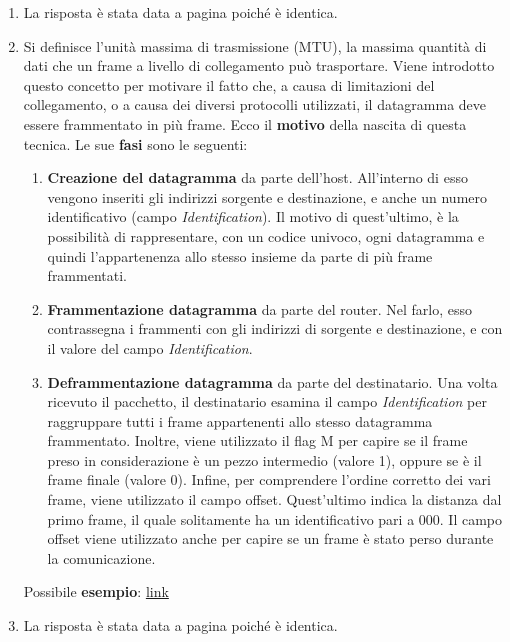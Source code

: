 \documentclass[a4paper]{article}
\begin{document}
	\begin{enumerate}
		\item La risposta è stata data a pagina \pageref{CSMA/CD} poiché è identica.
		
		\item Si definisce l'unità massima di trasmissione (MTU), la massima quantità di dati che un frame a livello di collegamento può trasportare. Viene introdotto questo concetto per motivare il fatto che, a causa di limitazioni del collegamento, o a causa dei diversi protocolli utilizzati, il datagramma deve essere frammentato in più frame. Ecco il \textbf{motivo} della nascita di questa tecnica.\newline
		Le sue \textbf{fasi} sono le seguenti:
		\begin{enumerate}
			\item \textbf{Creazione del datagramma} da parte dell'host. All'interno di esso vengono inseriti gli indirizzi sorgente e destinazione, e anche un numero identificativo (campo \emph{Identification}). Il motivo di quest'ultimo, è la possibilità di rappresentare, con un codice univoco, ogni datagramma e quindi l'appartenenza allo stesso insieme da parte di più frame frammentati.
			
			\item \textbf{Frammentazione datagramma} da parte del router. Nel farlo, esso contrassegna i frammenti con gli indirizzi di sorgente e destinazione, e con il valore del campo \emph{Identification}.
			
			\item \textbf{Deframmentazione datagramma} da parte del destinatario. Una volta ricevuto il pacchetto, il destinatario esamina il campo \emph{Identification} per raggruppare tutti i frame appartenenti allo stesso datagramma frammentato. Inoltre, viene utilizzato il flag M per capire se il frame preso in considerazione è un pezzo intermedio (valore 1), oppure se è il frame finale (valore 0).\newline
			Infine, per comprendere l'ordine corretto dei vari frame, viene utilizzato il campo offset. Quest'ultimo indica la distanza dal primo frame, il quale solitamente ha un identificativo pari a $000$. Il campo offset viene utilizzato anche per capire se un frame è stato perso durante la comunicazione.
		\end{enumerate}
		Possibile \textbf{esempio}: \href{https://packetpushers.net/ip-fragmentation-in-detail/#:~:text=Worked%20Example&text=1104%20%2B%20316%20%3D%201420.,1480%20%E2%80%93%2060%20%3D%201420.}{link}
		
		\item La risposta è stata data a pagina \pageref{header UDP} poiché è identica.
	\end{enumerate}
	
\end{document}
